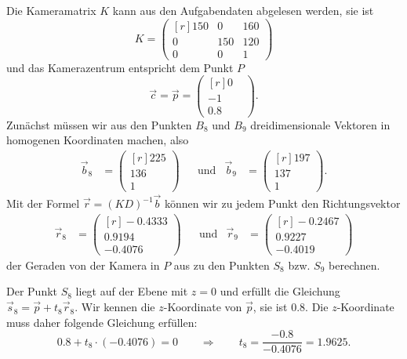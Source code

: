 \begin{loesung}
\begin{teilaufgaben}
\item
Die Kameramatrix $K$ kann aus den Aufgabendaten abgelesen werden, sie ist
\[
K
=
\begin{pmatrix*}[r]
150&  0&160\\
  0&150&120\\
  0&  0&  1
\end{pmatrix*}
\]
und das Kamerazentrum entspricht dem Punkt $P$
\[
\vec c = \vec p = 
\begin{pmatrix*}[r]
0\phantom{.0}\\ -1\phantom{.0}\\ 0.8
\end{pmatrix*}.
\]
Zunächst müssen wir aus den Punkten $B_8$ und $B_9$ dreidimensionale Vektoren
in homogenen Koordinaten machen, also
\[
\begin{aligned}
\vec b_8 &= \begin{pmatrix*}[r]225\\136\\1\end{pmatrix*}
&&\text{und}&
\vec b_9 &= \begin{pmatrix*}[r]197\\137\\1\end{pmatrix*}.
\end{aligned}
\]
Mit der Formel $\vec{r} = (KD)^{-1} \vec b$ können wir zu jedem Punkt
den Richtungsvektor
\[
\begin{aligned}
\vec r_8
&=
\begin{pmatrix*}[r]
-0.4333 \\
 0.9194 \\
-0.4076
\end{pmatrix*}
&&\text{und}&
\vec r_9 &= 
\begin{pmatrix*}[r]
-0.2467 \\
 0.9227 \\
-0.4019
\end{pmatrix*}
\end{aligned}
\]
der Geraden von der Kamera in $P$ aus zu den Punkten $S_8$ bzw. $S_9$ berechnen.

Der Punkt $S_8$ liegt auf der Ebene mit $z=0$ und erfüllt die
Gleichung $\vec s_8 = \vec {p} + t_8\vec{r}_8$.
Wir kennen die $z$-Koordinate von $\vec{p}$, sie ist $0.8$.
Die $z$-Koordinate muss daher folgende Gleichung erfüllen:
\[
0.8 + t_8\cdot (-0.4076) = 0
\qquad\Rightarrow\qquad
t_8 = \frac{-0.8}{-0.4076}=1.9625.
\]


\end{teilaufgaben}
\end{loesung}
